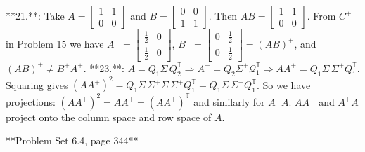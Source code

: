 

**21.**: Take \(A=\begin{bmatrix}1&1\\ 0&0\end{bmatrix}\) and \(B=\begin{bmatrix}0&0\\ 1&1\end{bmatrix}\). Then \(AB=\begin{bmatrix}1&1\\ 0&0\end{bmatrix}\). From \(C^{+}\) in Problem 15 we have \(A^{+}=\begin{bmatrix}\frac{1}{2}&0\\ \frac{1}{2}&0\end{bmatrix}\), \(B^{+}=\begin{bmatrix}0&\frac{1}{2}\\ 0&\frac{1}{2}\end{bmatrix}=(AB)^{+}\), and \((AB)^{+}\neq B^{+}A^{+}\).
**23.**: \(A=Q_{1}\Sigma\,Q_{2}^{\mathbb{T}}\Rightarrow A^{+}=Q_{2}\Sigma^{+}\mathcal{Q} _{1}^{\mathbb{T}}\Rightarrow AA^{+}=Q_{1}\Sigma\,\Sigma^{+}Q_{1}^{\mathbb{T}}\). Squaring gives \((AA^{+})^{2}=Q_{1}\Sigma\,\Sigma^{+}\Sigma\,\Sigma^{+}Q_{1}^{\mathbb{T}}=Q_{1} \Sigma\,\Sigma^{+}Q_{1}^{\mathbb{T}}\). So we have projections: \((AA^{+})^{2}=AA^{+}=(AA^{+})^{\mathbb{T}}\) and similarly for \(A^{+}A\). \(AA^{+}\) and \(A^{+}A\) project onto the column space and row space of \(A\).

**Problem Set 6.4, page 344**

